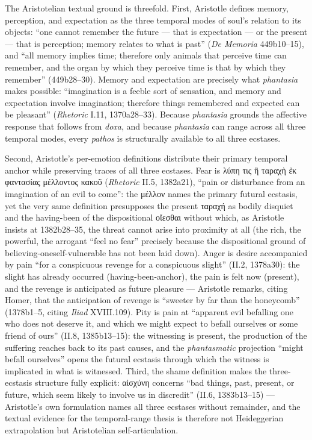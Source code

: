 \documentclass{article}
\newcommand{\gk}[1]{{\greekfont #1}}
\begin{document}
The Aristotelian textual ground is threefold. First, Aristotle defines memory, perception, and expectation as the three temporal modes of soul's relation to its objects: ``one cannot remember the future --- that is expectation --- or the present --- that is perception; memory relates to what is past'' (\textit{De Memoria} 449b10--15), and ``all memory implies time; therefore only animals that perceive time can remember, and the organ by which they perceive time is that by which they remember'' (449b28--30). Memory and expectation are precisely what \textit{phantasia} makes possible: ``imagination is a feeble sort of sensation, and memory and expectation involve imagination; therefore things remembered and expected can be pleasant'' (\textit{Rhetoric} I.11, 1370a28--33). Because \textit{phantasia} grounds the affective response that follows from \textit{doxa}, and because \textit{phantasia} can range across all three temporal modes, every \textit{pathos} is structurally available to all three ecstases.

Second, Aristotle's per-emotion definitions distribute their primary temporal anchor while preserving traces of all three ecstases. Fear is \gk{λύπη τις ἢ ταραχὴ ἐκ φαντασίας μέλλοντος κακοῦ} (\textit{Rhetoric} II.5, 1382a21), ``pain or disturbance from an imagination of an evil to come'': the \gk{μέλλον} names the primary futural ecstasis, yet the very same definition presupposes the present \gk{ταραχή} as bodily disquiet and the having-been of the dispositional \gk{οἴεσθαι} without which, as Aristotle insists at 1382b28--35, the threat cannot arise into proximity at all (the rich, the powerful, the arrogant ``feel no fear'' precisely because the dispositional ground of believing-oneself-vulnerable has not been laid down). Anger is desire accompanied by pain ``for a conspicuous revenge for a conspicuous slight'' (II.2, 1378a30): the slight has already occurred (having-been-anchor), the pain is felt now (present), and the revenge is anticipated as future pleasure --- Aristotle remarks, citing Homer, that the anticipation of revenge is ``sweeter by far than the honeycomb'' (1378b1--5, citing \textit{Iliad} XVIII.109). Pity is pain at ``apparent evil befalling one who does not deserve it, and which we might expect to befall ourselves or some friend of ours'' (II.8, 1385b13--15): the witnessing is present, the production of the suffering reaches back to its past causes, and the \textit{phantasmatic} projection ``might befall ourselves'' opens the futural ecstasis through which the witness is implicated in what is witnessed. Third, the shame definition makes the three-ecstasis structure fully explicit: \gk{αἰσχύνη} concerns ``bad things, past, present, or future, which seem likely to involve us in discredit'' (II.6, 1383b13--15) --- Aristotle's own formulation names all three ecstases without remainder, and the textual evidence for the temporal-range thesis is therefore not Heideggerian extrapolation but Aristotelian self-articulation.
\end{document}
